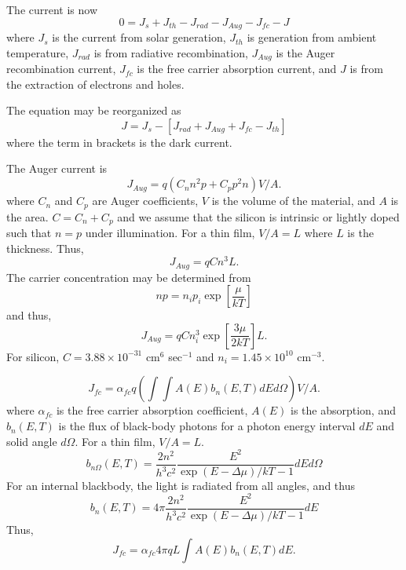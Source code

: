 \documentclass[12pt]{article}
\begin{document}
The current is now 
\begin{equation}
0 = J_s + J_{th} - J_{rad} - J_{Aug} - J_{fc} - J
\end{equation}
where $J_s$ is the current from solar generation, $J_{th}$ is generation from ambient temperature, $J_{rad}$ is from radiative recombination, $J_{Aug}$ is the Auger recombination current, $J_{fc}$ is the free carrier absorption current, and $J$ is from the extraction of electrons and holes.  

The equation may be reorganized as 
\begin{equation}
J = J_s - [J_{rad} + J_{Aug} + J_{fc} - J_{th}]
\end{equation}
where the term in brackets is the dark current.  

The Auger current is 
\begin{equation}
J_{Aug} = q (C_n n^2 p + C_p p^2 n) V/A.
\end{equation}
where $C_n$ and $C_p$ are Auger coefficients, $V$ is the volume of the material, and $A$ is the area.  
$C = C_n + C_p$ and we assume that the silicon is intrinsic or lightly doped such that $n = p$ under illumination.  
For a thin film, $V/A = L$ where $L$ is the thickness.  Thus, 
\begin{equation}
J_{Aug} = q C n^3 L.
\end{equation}
The carrier concentration may be determined from 
\begin{equation}
n p = n_i p_i \exp\left [ \frac{\mu}{k T} \right ]
\end{equation}
and thus, 
\begin{equation}
\boxed{J_{Aug} = q C n_i^{3} \exp \left [\frac{3 \mu}{2 k T} \right ] L.}
\end{equation}
For silicon, $C = 3.88 \times 10^{-31}$ cm$^{6}$ sec$^{-1}$ and $n_i = 1.45 \times 10^{10}$ cm$^{-3}$.    

\begin{equation}
J_{fc} = \alpha_{fc} q \left ( \int \int A(E) b_n(E, T) dE d\Omega \right) V/A.
\end{equation}
where $\alpha_{fc}$ is the free carrier absorption coefficient, $A(E)$ is the absorption, and $b_n(E, T)$ is the flux of black-body photons for a photon energy interval $dE$ and solid angle $d \Omega$.  For a thin film, $V/A = L$.
\begin{equation}
\boxed{b_{n \Omega} (E, T) = \frac{2 n^2}{h^3 c^2} \frac{E^2}{\exp(E - \Delta \mu)/k T - 1} dE d \Omega}
\end{equation}
For an internal blackbody, the light is radiated from all angles, and thus
\begin{equation}
b_{n} (E, T) = 4 \pi \frac{2 n^2}{h^3 c^2} \frac{E^2}{\exp(E - \Delta \mu)/k T - 1} dE
\end{equation}
Thus, 
\begin{equation}
\boxed{J_{fc} = \alpha_{fc} 4 \pi q L \int A(E) b_n(E, T) dE .}
\end{equation}
\end{document}
